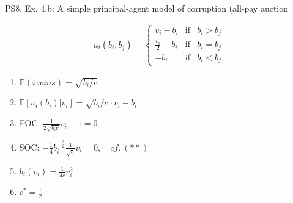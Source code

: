 \begin{frame}{PS8, Ex. 4.b: A simple principal-agent model of corruption (all-pay auction}
\begin{multicols}{2}
\begin{align*}
        u_i(b_i,b_j)=\left\{\begin{array}{lcl}
          v_i-b_i           & \text{if} & b_i>b_j \\
          \frac{v_i}{2}-b_i & \text{if} & b_i=b_j \\
          -b_i              & \text{if} & b_i<b_j
        \end{array}\right.
      \end{align*} \vspace{-16pt}
      \begin{enumerate}
        \item $\mathbb{P}(i\ wins)=\sqrt{b_i/c}$
        \item $\mathbb{E}[u_i(b_i)|v_i]=\sqrt{b_i/c}\cdot v_i-b_i$
        \item FOC: $\frac{1}{2\sqrt{b_ic}}v_i-1=0$
        \item[] SOC: $-\frac{1}{4}b_i^{-\frac{3}{2}}\frac{1}{\sqrt{c}}v_i=0,\quad cf.\ (**)$
        \item $b_i(v_i)=\frac{1}{4c}v_i^2$
        \item $c^*=\frac{1}{2}$
      \end{enumerate}
      \vfill\null
    \end{multicols}
\end{frame}
